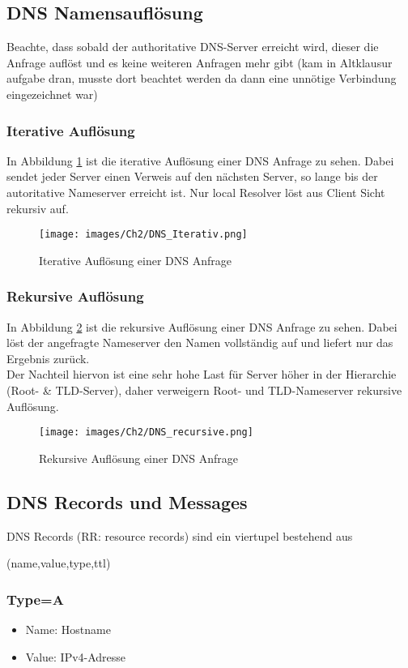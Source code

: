 \subsection{DNS Namensauflösung}
Beachte, dass sobald der authoritative DNS-Server erreicht wird, dieser die Anfrage auflöst und es keine weiteren Anfragen mehr gibt (kam in Altklausur aufgabe dran, musste dort beachtet werden da dann eine unnötige Verbindung eingezeichnet war)
\subsubsection{Iterative Auflösung}
In Abbildung \ref{Ch02-DNS_iterative} ist die iterative Auflösung einer DNS Anfrage zu sehen. Dabei sendet jeder Server einen Verweis auf den nächsten Server, so lange bis der autoritative Nameserver erreicht ist. Nur local Resolver löst aus Client Sicht rekursiv auf.
\begin{figure}[H]
    \centering
    \texttt{[image: images/Ch2/DNS\_Iterativ.png]}
    \caption{Iterative Auflösung einer DNS Anfrage}
    \label{Ch02-DNS_iterative}
\end{figure}

\subsubsection{Rekursive Auflösung}
In Abbildung \ref{Ch02-DNS-recursive} ist die rekursive Auflösung einer DNS Anfrage zu sehen. Dabei löst der angefragte Nameserver den Namen vollständig auf und liefert nur das Ergebnis zurück.\\
\noindent Der Nachteil hiervon ist eine sehr hohe Last für Server höher in der Hierarchie (Root- \& TLD-Server), daher verweigern Root- und TLD-Nameserver rekursive Auflösung.
\begin{figure}[H]
    \centering
    \texttt{[image: images/Ch2/DNS\_recursive.png]}
    \caption{Rekursive Auflösung einer DNS Anfrage}
    \label{Ch02-DNS-recursive}
\end{figure}

\subsection{DNS Records und Messages}
DNS Records (RR: resource records) sind ein viertupel bestehend aus
\begin{center}
    (name,value,type,ttl)
\end{center}

\subsubsection{Type=A}
\begin{itemize}
    \item Name: Hostname
    \item Value: IPv4-Adresse
\end{itemize}

